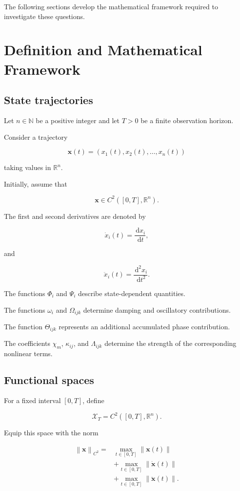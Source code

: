 \documentclass[12pt]{article}
\numberwithin{equation}{section}
\newcommand{\R}{\mathbb{R}}
\newcommand{\N}{\mathbb{N}}
\newcommand{\norm}[1]{\left\lVert #1 \right\rVert}
\newcommand{\dd}{\,\mathrm{d}}
\theoremstyle{definition}
\theoremstyle{remark}
\begin{document}
The following sections develop the mathematical
framework required to investigate these questions.


\section{Definition and Mathematical Framework}

\subsection{State trajectories}

Let \(n\in\N\) be a positive integer and
let \(T>0\) be a finite observation horizon.

Consider a trajectory

\[
\mathbf{x}(t)
=
(x_1(t),x_2(t),\ldots,x_n(t))
\]

taking values in \(\R^n\).

Initially, assume that

\[
\mathbf{x}\in C^2([0,T],\R^n).
\]

The first and second derivatives are denoted by

\[
\dot{x}_i(t)
=
\frac{\dd x_i}{\dd t},
\]

and

\[
\ddot{x}_i(t)
=
\frac{\dd^2x_i}{\dd t^2}.
\]

The functions \(\Phi_i\) and \(\Psi_i\)
describe state-dependent quantities.

The functions \(\omega_i\) and
\(\Omega_{ijk}\) determine damping and
oscillatory contributions.

The function \(\Theta_{ijk}\) represents
an additional accumulated phase contribution.

The coefficients \(\chi_m\), \(\kappa_{ij}\),
and \(\Lambda_{ijk}\) determine the strength
of the corresponding nonlinear terms.

\subsection{Functional spaces}

For a fixed interval \([0,T]\), define

\[
\mathcal{X}_T
=
C^2([0,T],\R^n).
\]

Equip this space with the norm

\[
\begin{aligned}
\norm{\mathbf{x}}_{C^2}
={}&
\max_{t\in[0,T]}
\norm{\mathbf{x}(t)}
\\
&+
\max_{t\in[0,T]}
\norm{\dot{\mathbf{x}}(t)}
\\
&+
\max_{t\in[0,T]}
\norm{\ddot{\mathbf{x}}(t)}.
\end{aligned}
\]
\end{document}
